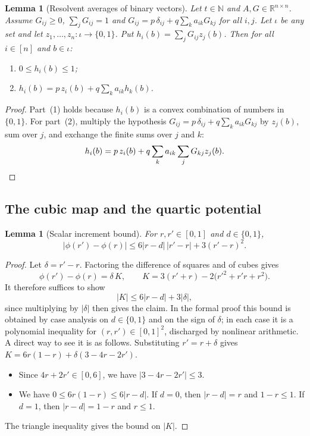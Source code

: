 \documentclass[11pt]{article}
\newtheorem{lemma}[theorem]{Lemma}
\theoremstyle{definition}
\theoremstyle{remark}
\newcommand{\R}{\mathbb{R}}
\newcommand{\N}{\mathbb{N}}
\begin{document}
\begin{lemma}[Resolvent averages of binary vectors]\label{lem:mc_harmonic_point}
Let $t\in\N$ and $A,G\in\R^{n\times n}$. Assume $G_{ij}\ge0$, $\sum_jG_{ij}=1$ and $G_{ij}=p\,\delta_{ij}+q\sum_ka_{ik}G_{kj}$ for all $i,j$. Let $\iota$ be any set and let $z_1,\dots,z_n:\iota\to\{0,1\}$. Put $h_i(b)=\sum_jG_{ij}z_j(b)$. Then for all $i\in[n]$ and $b\in\iota$:
\begin{enumerate}
\item $0\le h_i(b)\le1$;
\item $h_i(b)=p\,z_i(b)+q\sum_ka_{ik}h_k(b)$.
\end{enumerate}
\end{lemma}
\begin{proof}
Part~(1) holds because $h_i(b)$ is a convex combination of numbers in $\{0,1\}$. For part~(2), multiply the hypothesis $G_{ij}=p\,\delta_{ij}+q\sum_ka_{ik}G_{kj}$ by $z_j(b)$, sum over $j$, and exchange the finite sums over $j$ and $k$:
\[
h_i(b)=p\,z_i(b)+q\sum_ka_{ik}\sum_jG_{kj}z_j(b). \qedhere
\]
\end{proof}

\subsection{The cubic map and the quartic potential}

\begin{lemma}[Scalar increment bound]\label{lem:mc_phi_scalar}
For $r,r'\in[0,1]$ and $d\in\{0,1\}$,
\[
|\phi(r')-\phi(r)|\le6|r-d|\,|r'-r|+3(r'-r)^2 .
\]
\end{lemma}
\begin{proof}
Let $\delta=r'-r$. Factoring the difference of squares and of cubes gives
\[
\phi(r')-\phi(r)=\delta\,K,\qquad K=3(r'+r)-2\bigl(r'^2+r'r+r^2\bigr).
\]
It therefore suffices to show
\[
|K|\le6|r-d|+3|\delta|,
\]
since multiplying by $|\delta|$ then gives the claim. In the formal proof this bound is obtained by case analysis on $d\in\{0,1\}$ and on the sign of $\delta$; in each case it is a polynomial inequality for $(r,r')\in[0,1]^2$, discharged by nonlinear arithmetic. A direct way to see it is as follows. Substituting $r'=r+\delta$ gives $K=6r(1-r)+\delta(3-4r-2r')$.
\begin{itemize}
\item Since $4r+2r'\in[0,6]$, we have $|3-4r-2r'|\le3$.
\item We have $0\le6r(1-r)\le6|r-d|$. If $d=0$, then $|r-d|=r$ and $1-r\le1$. If $d=1$, then $|r-d|=1-r$ and $r\le1$.
\end{itemize}
The triangle inequality gives the bound on $|K|$.
\end{proof}
\end{document}
